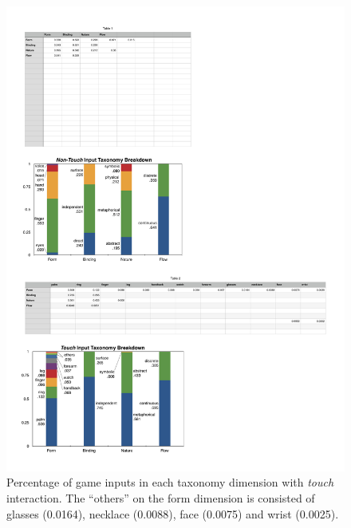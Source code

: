 \documentclass{sigchi}
\begin{document}
 \begin{figure}[!h]
  \centering
  \includegraphics[width=1.0\columnwidth]{OnbodyTaxonomy.pdf}
  \caption{Percentage of game inputs in each taxonomy dimension with \emph{touch} interaction. The  ``others'' on the form dimension is consisted of glasses (0.0164), necklace (0.0088), face (0.0075) and wrist (0.0025).}
  \label{fig:OnbodyTaxonomy}
  \end{figure} 
\end{document}
